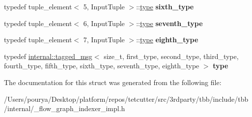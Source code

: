 \begin{DoxyCompactItemize}
\item 
\hypertarget{structinternal_1_1input__types_3_018_00_01InputTuple_01_4_a616ddbd32c67746ff946ba7dbe18aba7}{}typedef tuple\+\_\+element$<$ 5, Input\+Tuple $>$\+::\hyperlink{classinternal_1_1tagged__msg}{type} {\bfseries sixth\+\_\+type}\label{structinternal_1_1input__types_3_018_00_01InputTuple_01_4_a616ddbd32c67746ff946ba7dbe18aba7}

\item 
\hypertarget{structinternal_1_1input__types_3_018_00_01InputTuple_01_4_a17c1a64b11251995fe9d6da7ec067c2f}{}typedef tuple\+\_\+element$<$ 6, Input\+Tuple $>$\+::\hyperlink{classinternal_1_1tagged__msg}{type} {\bfseries seventh\+\_\+type}\label{structinternal_1_1input__types_3_018_00_01InputTuple_01_4_a17c1a64b11251995fe9d6da7ec067c2f}

\item 
\hypertarget{structinternal_1_1input__types_3_018_00_01InputTuple_01_4_ac92a45bce529d584c73e2cacc1cb1001}{}typedef tuple\+\_\+element$<$ 7, Input\+Tuple $>$\+::\hyperlink{classinternal_1_1tagged__msg}{type} {\bfseries eighth\+\_\+type}\label{structinternal_1_1input__types_3_018_00_01InputTuple_01_4_ac92a45bce529d584c73e2cacc1cb1001}

\item 
\hypertarget{structinternal_1_1input__types_3_018_00_01InputTuple_01_4_af41cf47d4c20aa6d20a9134afeb34966}{}typedef \hyperlink{classinternal_1_1tagged__msg}{internal\+::tagged\+\_\+msg}$<$ size\+\_\+t, first\+\_\+type, second\+\_\+type, third\+\_\+type, fourth\+\_\+type, fifth\+\_\+type, sixth\+\_\+type, seventh\+\_\+type, eighth\+\_\+type $>$ {\bfseries type}\label{structinternal_1_1input__types_3_018_00_01InputTuple_01_4_af41cf47d4c20aa6d20a9134afeb34966}

\end{DoxyCompactItemize}


The documentation for this struct was generated from the following file\+:\begin{DoxyCompactItemize}
\item 
/\+Users/pourya/\+Desktop/platform/repos/tetcutter/src/3rdparty/tbb/include/tbb/internal/\+\_\+flow\+\_\+graph\+\_\+indexer\+\_\+impl.\+h\end{DoxyCompactItemize}
